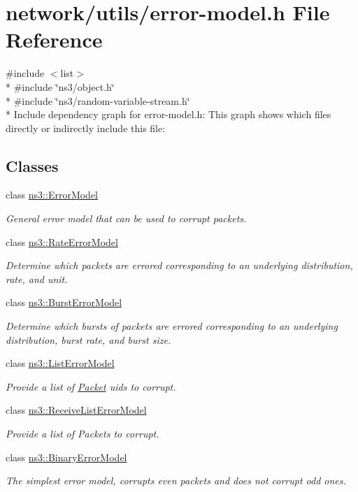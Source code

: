 \hypertarget{error-model_8h}{}\section{network/utils/error-\/model.h File Reference}
\label{error-model_8h}
{\ttfamily \#include $<$list$>$}\\*
{\ttfamily \#include \char`\"{}ns3/object.\+h\char`\"{}}\\*
{\ttfamily \#include \char`\"{}ns3/random-\/variable-\/stream.\+h\char`\"{}}\\*
Include dependency graph for error-\/model.h\+:
This graph shows which files directly or indirectly include this file\+:
\subsection*{Classes}
\begin{DoxyCompactItemize}
\item 
class \hyperlink{classns3_1_1ErrorModel}{ns3\+::\+Error\+Model}
\begin{DoxyCompactList}\small\item\em General error model that can be used to corrupt packets. \end{DoxyCompactList}\item 
class \hyperlink{classns3_1_1RateErrorModel}{ns3\+::\+Rate\+Error\+Model}
\begin{DoxyCompactList}\small\item\em Determine which packets are errored corresponding to an underlying distribution, rate, and unit. \end{DoxyCompactList}\item 
class \hyperlink{classns3_1_1BurstErrorModel}{ns3\+::\+Burst\+Error\+Model}
\begin{DoxyCompactList}\small\item\em Determine which bursts of packets are errored corresponding to an underlying distribution, burst rate, and burst size. \end{DoxyCompactList}\item 
class \hyperlink{classns3_1_1ListErrorModel}{ns3\+::\+List\+Error\+Model}
\begin{DoxyCompactList}\small\item\em Provide a list of \hyperlink{classns3_1_1Packet}{Packet} uids to corrupt. \end{DoxyCompactList}\item 
class \hyperlink{classns3_1_1ReceiveListErrorModel}{ns3\+::\+Receive\+List\+Error\+Model}
\begin{DoxyCompactList}\small\item\em Provide a list of Packets to corrupt. \end{DoxyCompactList}\item 
class \hyperlink{classns3_1_1BinaryErrorModel}{ns3\+::\+Binary\+Error\+Model}
\begin{DoxyCompactList}\small\item\em The simplest error model, corrupts even packets and does not corrupt odd ones. \end{DoxyCompactList}\end{DoxyCompactItemize}
